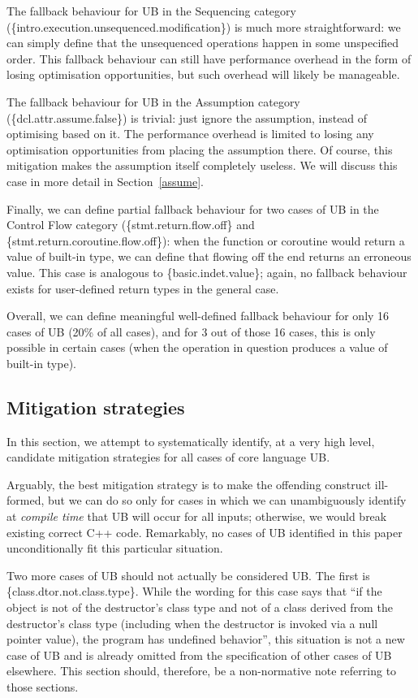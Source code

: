 The fallback behaviour for UB in the Sequencing category (\{intro.execution.unsequenced.modifica\-tion\})
is much more straightforward: we can simply define that the unsequenced operations happen in some unspecified order. This fallback behaviour can still have performance overhead in the form of losing  optimisation opportunities, but such overhead will likely be manageable. 

The fallback behaviour for UB in the Assumption category (\{dcl.attr.assume.false\}) is trivial: just ignore the assumption, instead of optimising based on it. The performance overhead is limited to losing any optimisation opportunities from placing the assumption there. Of course, this mitigation makes the assumption itself completely useless. We will discuss this case in more detail in Section~\ref{assume}.

Finally, we can define partial fallback behaviour for two cases of UB in the Control Flow category  (\{stmt.return.flow.off\} and \{stmt.return.coroutine.flow.off\}): when the function or coroutine would return a value of built-in type, we can define that flowing off the end returns an erroneous value. This case is analogous to \{basic.indet.value\}; again, no fallback behaviour exists for user-defined return types in the general case.

Overall, we can define meaningful well-defined fallback behaviour for only 16 cases of UB (20\% of all cases), and for 3 out of those 16 cases, this is only possible in certain cases (when the operation in question produces a value of built-in type).

\subsection{Mitigation strategies}
\label{mitigation}

In this section, we attempt to systematically identify, at a very high level, candidate mitigation strategies for all cases of core language UB.

Arguably, the best mitigation strategy is to make the offending construct ill-formed, but we can do so only for cases in which we can unambiguously identify at \emph{compile time} that UB will occur for all inputs; otherwise, we would break existing correct C++ code. Remarkably, no cases of UB identified in this paper unconditionally fit this particular situation.

Two more cases of UB should not actually be considered UB. The first is \{class.dtor.not.class.type\}. While the wording for this case says that ``if the object is not of the destructor's class type and not of a class derived from the destructor's class type (including when the destructor is invoked via a null pointer value), the program has undefined behavior'',
this situation is not a new case of UB and is already omitted from the specification of other cases of UB elsewhere. This section should, therefore, be a non-normative note referring to those sections.

